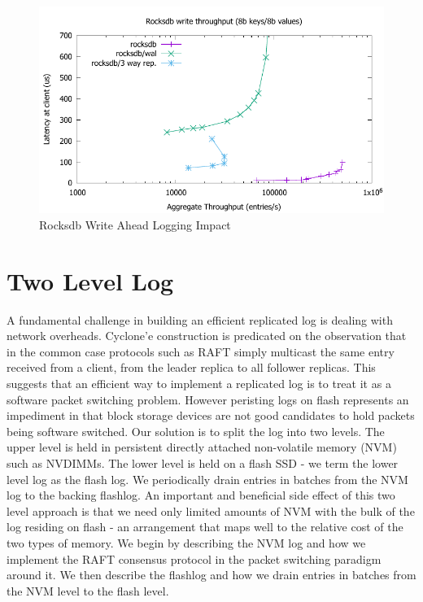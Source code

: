 \documentclass[10pt, preprint, nonatbib]{sigplanconf}
\begin{document}
\begin{figure}
\centering
\includegraphics[scale=0.6]{results2/problem.pdf}
\caption{Rocksdb Write Ahead Logging Impact}
\label{fig:wal_impact}
\end{figure}

\section{Two Level Log}
A fundamental challenge in building an efficient replicated log is dealing with
network overheads. Cyclone'e construction is predicated on the observation that
in the common case protocols such as RAFT simply multicast the same entry
received from a client, from the leader replica to all follower replicas. This
suggests that an efficient way to implement a replicated log is to treat it as a
software packet switching problem. However peristing logs on flash represents an
impediment in that block storage devices are not good candidates to hold packets
being software switched. Our solution is to split the log into two levels. The
upper level is held in persistent directly attached non-volatile memory (NVM)
such as NVDIMMs. The lower level is held on a flash SSD - we term the lower
level log as the flash log. We periodically drain entries in batches from the
NVM log to the backing flashlog. An important and beneficial side effect of this
two level approach is that we need only limited amounts of NVM with the bulk of
the log residing on flash - an arrangement that maps well to the relative cost
of the two types of memory. We begin by describing the NVM log and how we
implement the RAFT consensus protocol in the packet switching paradigm around
it. We then describe the flashlog and how we drain entries in batches from the
NVM level to the flash level.
\end{document}

